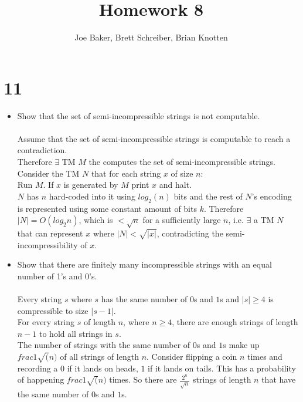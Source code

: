 \documentclass[letterpaper,notitlepage,twoside]{article}
\newcommand\tab[1][1cm]{\hspace*{#1}} %
\begin{document}
\title{Homework 8}
\author{Joe Baker, Brett Schreiber, Brian Knotten}
\maketitle

\section*{11}
\begin{itemize}

\item Show that the set of semi-incompressible strings is not computable. \\\\
Assume that the set of semi-incompressible strings is computable to reach a contradiction. \\
Therefore $\exists$ TM $M$ the computes the set of semi-incompressible strings. \\
Consider the TM $N$ that for each string $x$ of size $n$: \\
\tab Run $M$. If $x$ is generated by $M$ print $x$ and halt. \\
$N$ has $n$ hard-coded into it using $log_{2} (n)$ bits and the rest of $N$'s encoding is represented using some constant amount of bits $k$. Therefore $|N| = O(log_{2} n)$, which is $< \sqrt{n}$ for a sufficiently large $n$, i.e. $\exists$ a TM $N$ that can represent $x$ where $|N| < \sqrt{|x|}$, contradicting the semi-incompressibility of $x$.\\

\item Show that there are finitely many incompressible strings with an equal number of 1's and 0's. \\\\
Every string $s$ where $s$ has the same number of $0$s and $1$s and $|s| \geq 4$ is compressible to size $|s - 1|$.\\
For every string $s$ of length $n$, where $n \geq 4$, there are enough strings of length $n - 1$ to hold all strings in $s$.\\
The number of strings with the same number of $0$s and $1$s make up $frac{1}{\sqrt(n)}$ of all strings of length $n$.
Consider flipping a coin $n$ times and recording a $0$ if it lands on heads, $1$ if it lands on tails. This has a probability of happening $frac{1}{\sqrt(n)}$ times.
So there are $\frac{2^n}{\sqrt{n}}$ strings of length $n$ that have the same number of $0$s and $1$s.\\


\end{itemize}
\end{document}
